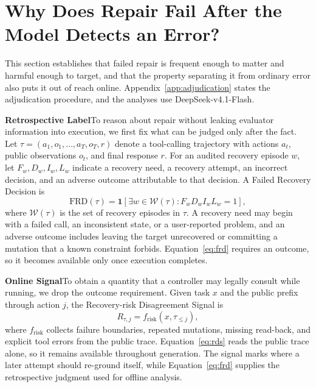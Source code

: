 \documentclass{article}
\begin{document}
\section{Why Does Repair Fail After the Model Detects an Error?}
\label{sec:failed-repair}
This section establishes that failed repair is frequent enough to matter and harmful enough to target, and that the property separating it from ordinary error also puts it out of reach online. Appendix~\ref{app:adjudication} states the adjudication procedure, and the analyses use DeepSeek-v4.1-Flash.

\textbf{Retrospective Label}\quad To reason about repair without leaking evaluator information into execution, we first fix what can be judged only after the fact. Let $\tau=(a_1,o_1,\ldots,a_T,o_T,r)$ denote a tool-calling trajectory with actions $a_t$, public observations $o_t$, and final response $r$. For an audited recovery episode $w$, let $F_w,D_w,I_w,L_w$ indicate a recovery need, a recovery attempt, an incorrect decision, and an adverse outcome attributable to that decision. A Failed Recovery Decision is
\begin{equation}
\mathrm{FRD}(\tau)=\mathbf{1}\!\left[\exists w\in\mathcal{W}(\tau):F_wD_wI_wL_w=1\right],
\label{eq:frd}
\end{equation}
where $\mathcal{W}(\tau)$ is the set of recovery episodes in $\tau$. A recovery need may begin with a failed call, an inconsistent state, or a user-reported problem, and an adverse outcome includes leaving the target unrecovered or committing a mutation that a known constraint forbids. Equation~\ref{eq:frd} requires an outcome, so it becomes available only once execution completes.

\textbf{Online Signal}\quad To obtain a quantity that a controller may legally consult while running, we drop the outcome requirement. Given task $x$ and the public prefix through action $j$, the Recovery-risk Disagreement Signal is
\begin{equation}
R_{\tau,j}=f_{\mathrm{risk}}(x,\tau_{\leq j}),
\label{eq:rds}
\end{equation}
where $f_{\mathrm{risk}}$ collects failure boundaries, repeated mutations, missing read-back, and explicit tool errors from the public trace. Equation~\ref{eq:rds} reads the public trace alone, so it remains available throughout generation. The signal marks where a later attempt should re-ground itself, while Equation~\ref{eq:frd} supplies the retrospective judgment used for offline analysis.
\end{document}
